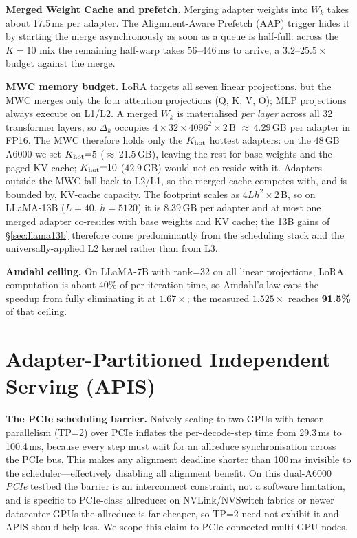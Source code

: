 \documentclass[conference]{IEEEtran}
\begin{document}
\textbf{Merged Weight Cache and prefetch.}
Merging adapter weights into $W_k$ takes about 17.5\,ms per adapter.  The
Alignment-Aware Prefetch (AAP) trigger hides it by starting the merge
asynchronously as soon as a queue is half-full: across the $K{=}10$ mix the
remaining half-warp takes $56$--$446$\,ms to arrive, a $3.2$--$25.5\times$
budget against the merge.

\textbf{MWC memory budget.}
LoRA targets all seven linear projections, but the MWC merges only the four
attention projections (Q, K, V, O); MLP projections always execute on L1/L2.  A merged $W_k$ is materialised \emph{per layer} across all 32 transformer
layers, so $\Delta_k$ occupies $4{\times}32{\times}4096^2{\times}2$\,B
${\approx}\,4.29$\,GB per adapter in FP16.  The MWC therefore holds only the
$K_{\rm hot}$ hottest adapters: on the 48\,GB A6000 we set $K_{\rm hot}{=}5$
(${\approx}\,21.5$\,GB), leaving the rest for base weights and the paged KV
cache; $K_{\rm hot}{=}10$ ($42.9$\,GB) would not co-reside with it.  Adapters
outside the MWC fall back to L2/L1, so the merged cache competes with, and is
bounded by, KV-cache capacity.
The footprint scales as $4Lh^2{\times}2$\,B, so on LLaMA-13B ($L{=}40$,
$h{=}5120$) it is $8.39$\,GB per adapter and at most one merged adapter
co-resides with base weights and KV cache; the 13B gains of
\S\ref{sec:llama13b} therefore come predominantly from the scheduling stack and
the universally-applied L2 kernel rather than from L3.

\textbf{Amdahl ceiling.}
On LLaMA-7B with rank=32 on all linear projections, LoRA computation is about
40\% of per-iteration time, so Amdahl's law caps the speedup from fully
eliminating it at $1.67\times$; the measured $1.525\times$ reaches
\textbf{91.5\%} of that ceiling.

\section{Adapter-Partitioned Independent Serving (APIS)}
\label{sec:apis}

\textbf{The PCIe scheduling barrier.}
Naively scaling to two GPUs with tensor-parallelism (TP=2) over PCIe
inflates the per-decode-step time
from 29.3\,ms to 100.4\,ms, because every step must wait for an allreduce
synchronisation across the PCIe bus.
This makes any alignment deadline shorter than 100\,ms invisible to the
scheduler---effectively disabling all alignment benefit.
On this dual-A6000 \emph{PCIe} testbed the barrier is an interconnect constraint,
not a software limitation, and is specific to PCIe-class allreduce: on
NVLink/NVSwitch fabrics or newer datacenter GPUs the allreduce is far cheaper, so
TP=2 need not exhibit it and APIS should help less.  We scope this claim to
PCIe-connected multi-GPU nodes.
\end{document}
